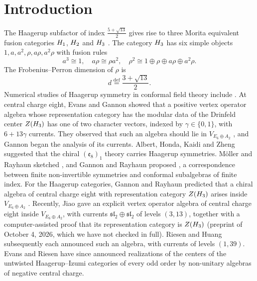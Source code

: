 \documentclass[leqno]{article}
\let\cal\relax
\newcommand{\cal}{\mathcal}
\newcommand{\ov}{\overset}
\numberwithin{equation}{section}
\begin{document}
{
  \hypersetup{linkcolor=blue}
 \tableofcontents
}

\section{Introduction}
\label{sec:Introduction}

The Haagerup subfactor of index $\frac{5+\sqrt{13}}{2}$ \cite{AsH99} gives rise to three Morita equivalent fusion categories $\cal H_1$, $\cal H_2$ and $\cal H_3$ \cite{GrS12}. The category $\cal H_3$ has six simple objects $1,a,a^2,\rho,a\rho,a^2\rho$ with fusion rules
\begin{equation}
\label{eq:fusion-rules}
a^3 \cong 1,\quad a\rho \cong \rho a^2,\quad \rho^2 \cong 1 \oplus \rho \oplus a\rho \oplus a^2\rho.
\end{equation}
The Frobenius--Perron dimension of $\rho$ is
\begin{equation}
\label{eq:d}
d \ov{\mathrm{def}}{=} \frac{3+\sqrt{13}}{2}.
\end{equation}
Numerical studies of Haagerup symmetry in conformal field theory include \cite{HL+22,V+22}. At central charge eight, Evans and Gannon \cite{EvG11} showed that a positive vertex operator algebra whose representation category has the modular data of the Drinfeld center $Z(\cal H_3)$ has one of two character vectors, indexed by $\gamma \in \{0,1\}$, with $6+13\gamma$ currents. They observed that such an algebra should lie in $V_{E_6 \oplus A_2}$ \cite[Section 2.4]{EvG11}, and Gannon \cite{Gan19} began the analysis of its currents. Albert, Honda, Kaidi and Zheng \cite{AHKZ26} suggested that the chiral $(\mathfrak e_8)_1$ theory carries Haagerup symmetries. Möller and Rayhaun sketched \cite{MoR24}, and Gannon and Rayhaun proposed \cite{GaR26}, a correspondence between finite non-invertible symmetries and conformal subalgebras of finite index. For the Haagerup categories, Gannon and Rayhaun predicted that a chiral algebra of central charge eight with representation category $Z(\cal H_3)$ arises inside $V_{E_6 \oplus A_2}$ \cite[Section 4.3]{GaR26}. Recently, Jiao \cite{Jia26} gave an explicit vertex operator algebra of central charge eight inside $V_{E_6 \oplus A_2}$, with currents $\mathfrak{sl}_2 \oplus \mathfrak{sl}_2$ of levels $(3,13)$, together with a computer-assisted proof that its representation category is $Z(\cal H_3)$ (preprint of October 4, 2026, which we have not checked in full). Riesen \cite{Rie26} and Huang \cite{Hua26} subsequently each announced such an algebra, with currents of levels $(1,39)$. Evans and Riesen \cite{EvR26} have since announced realizations of the centers of the untwisted Haagerup--Izumi categories of every odd order by non-unitary algebras of negative central charge.
\end{document}

